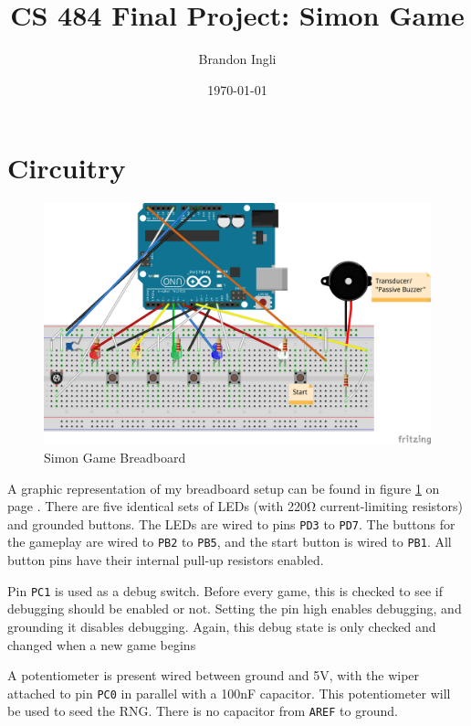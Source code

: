 \documentclass[11pt]{article}
\title{CS 484 Final Project: Simon Game}
\author{Brandon Ingli}
\date{\today}
\begin{document}
\maketitle

\section{Circuitry}

\begin{figure}[h]
  \centering
  \includegraphics[width=\textwidth]{simon_game.png}
  \caption{Simon Game Breadboard}
  \label{fig:breadboard}
\end{figure}

A graphic representation of my breadboard setup can be found in figure \ref{fig:breadboard} 
on page \pageref{fig:breadboard}. There are five identical sets of LEDs (with 
220\si{\ohm} current-limiting resistors) and grounded buttons. The LEDs are wired 
to pins \texttt{PD3} to \texttt{PD7}. The buttons for the gameplay are wired to 
\texttt{PB2} to \texttt{PB5}, and the start button is wired to \texttt{PB1}. All 
button pins have their internal pull-up resistors enabled.

Pin \texttt{PC1} is used as a debug switch. Before every game, this is checked to 
see if debugging should be enabled or not. Setting the pin high enables 
debugging, and grounding it disables debugging. Again, this debug state is only 
checked and changed when a new game begins

A potentiometer is present wired between ground and 5\si{\volt}, with the wiper 
attached to pin \texttt{PC0} in parallel with a 100\si{\nano\farad} capacitor. This 
potentiometer will be used to seed the RNG. There is no capacitor from \texttt{AREF} 
to ground.
\end{document}
